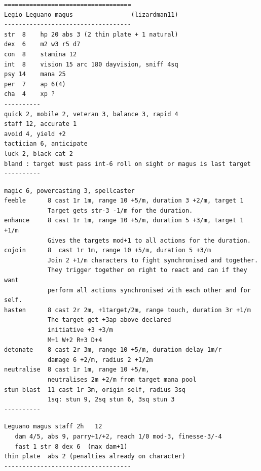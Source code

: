 \goodbreak
\begin{samepage}
\small \begin{verbatim}
===================================
Legio Leguano magus                (lizardman11)
-----------------------------------
str  8    hp 20 abs 3 (2 thin plate + 1 natural)
dex  6    m2 w3 r5 d7
con  8    stamina 12
int  8    vision 15 arc 180 dayvision, sniff 4sq
psy 14    mana 25
per  7    ap 6(4)
cha  4    xp ?
----------
quick 2, mobile 2, veteran 3, balance 3, rapid 4
staff 12, accurate 1
avoid 4, yield +2
tactician 6, anticipate
luck 2, black cat 2
bland : target must pass int-6 roll on sight or magus is last target
----------
\end{verbatim} \blocklistgap \begin{verbatim}
magic 6, powercasting 3, spellcaster
feeble      8 cast 1r 1m, range 10 +5/m, duration 3 +2/m, target 1
            Target gets str-3 -1/m for the duration.
enhance     8 cast 1r 1m, range 10 +5/m, duration 5 +3/m, target 1 +1/m
            Gives the targets mod+1 to all actions for the duration.
cojoin      8  cast 1r 1m, range 10 +5/m, duration 5 +3/m
            Join 2 +1/m characters to fight synchronised and together.
            They trigger together on right to react and can if they want
            perform all actions synchronised with each other and for self.
hasten      8 cast 2r 2m, +1target/2m, range touch, duration 3r +1/m
            The target get +3ap above declared
            initiative +3 +3/m
            M+1 W+2 R+3 D+4
detonate    8 cast 2r 3m, range 10 +5/m, duration delay 1m/r
            damage 6 +2/m, radius 2 +1/2m
neutralise  8 cast 1r 1m, range 10 +5/m,
            neutralises 2m +2/m from target mana pool
stun blast  11 cast 1r 3m, origin self, radius 3sq
            1sq: stun 9, 2sq stun 6, 3sq stun 3
----------
\end{verbatim} \blocklistgap \begin{verbatim}
Leguano magus staff 2h   12
   dam 4/5, abs 9, parry+1/+2, reach 1/0 mod-3, finesse-3/-4
   fast 1 str 8 dex 6  (max dam+1)
thin plate  abs 2 (penalties already on character)
-----------------------------------
\end{verbatim} \normalsize
\end{samepage}

\


